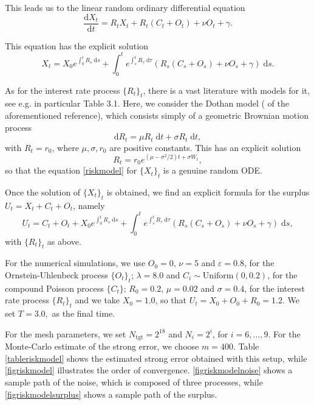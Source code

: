 \documentclass[reqno,12pt]{amsart}
\theoremstyle{plain} %
\theoremstyle{definition} %
\begin{document}
This leads us to the linear random ordinary differential equation
\begin{equation}
    \label{riskmodel}
    \frac{\mathrm{d}X_t}{\mathrm{d}t} = R_t X_t + R_t (C_t + O_t) + \nu O_t + \gamma.
\end{equation}

This equation has the explicit solution
\[
  X_t = X_0 e^{\int_0^t R_s\;\mathrm{d}s} + \int_0^t e^{\int_s^t R_\tau\;\mathrm{d}\tau} (R_s (C_s + O_s) + \nu O_s + \gamma)\;\mathrm{d}s.
\]

As for the interest rate process $\{R_t\}_t$, there is a vast literature with models for it, see e.g. \cite[Chapter 3]{BrigoMercurio2006} in particular Table 3.1. Here, we consider the Dothan model (\cite[Section 3.2.2]{BrigoMercurio2006} of the aforementioned reference), which consists simply of a geometric Brownian motion process
\[
  \mathrm{d}R_t = \mu R_t \;\mathrm{d}t + \sigma R_t\;\mathrm{d}t,
\]
with $R_t = r_0$, where $\mu, \sigma, r_0$ are positive constants. This has an explicit solution
\[
  R_t = r_0 e^{(\mu - \sigma^2/2)t + \sigma W_t},
\]
so that the equation \eqref{riskmodel} for $\{X_t\}_t$ is a genuine random ODE.

Once the solution of $\{X_t\}_t$ is obtained, we find an explicit formula for the surplus $U_t = X_t + C_t + O_t$, namely
\[
  U_t = C_t + O_t + X_0 e^{\int_0^t R_s\;\mathrm{d}s} + \int_0^t e^{\int_s^t R_\tau\;\mathrm{d}\tau} (R_s (C_s + O_s) + \nu O_s + \gamma)\;\mathrm{d}s,
\]
with $\{R_t\}_t$ as above.

For the numerical simulations, we use $O_0 = 0$, $\nu = 5$ and $\varepsilon = 0.8$, for the Ornstein-Uhlenbeck process $\{O_t\}_t$; $\lambda = 8.0$ and $C_i \sim \mathrm{Uniform}(0, 0.2)$, for the compound Poisson process $\{C_t\}$; $R_0 = 0.2$, $\mu = 0.02$ and $\sigma = 0.4$, for the interest rate process $\{R_t\}_t$ and we take $X_0 = 1.0$, so that $U_t = X_0 + O_0 + R_0 = 1.2$. We set $T = 3.0,$ as the final time.

For the mesh parameters, we set $N_{\textrm{tgt}} = 2^{18}$ and $N_i = 2^i$, for $i=6, \ldots, 9$. For the Monte-Carlo estimate of the strong error, we choose $m = 400.$ Table \ref{tableriskmodel} shows the estimated strong error obtained with this setup, while \cref{figriskmodel} illustrates the order of convergence. \cref{figriskmodelnoise} shows a sample path of the noise, which is composed of three processes, while \cref{figriskmodelsurplus} shows a sample path of the surplus.
\end{document}
